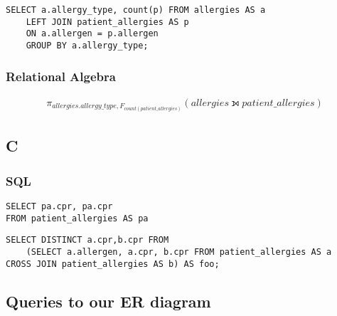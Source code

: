 \documentclass[a4paper,11pt]{article}
\begin{document}
\begin{verbatim}
SELECT a.allergy_type, count(p) FROM allergies AS a
    LEFT JOIN patient_allergies AS p
    ON a.allergen = p.allergen 
    GROUP BY a.allergy_type;
\end{verbatim}

\subsubsection{Relational Algebra}
\begin{align*}
   \pi_{allergies.allergy\_type, F_{count( patient\_allergies )}} (allergies \leftouterjoin patient\_allergies)
\end{align*}

\subsection{C}
\subsubsection{SQL}

\begin{verbatim}
SELECT pa.cpr, pa.cpr
FROM patient_allergies AS pa
\end{verbatim}

\begin{verbatim}
SELECT DISTINCT a.cpr,b.cpr FROM 
    (SELECT a.allergen, a.cpr, b.cpr FROM patient_allergies AS a
CROSS JOIN patient_allergies AS b) AS foo;
\end{verbatim}



% 


\subsection{Queries to our ER diagram}


\newpage
\end{document}
